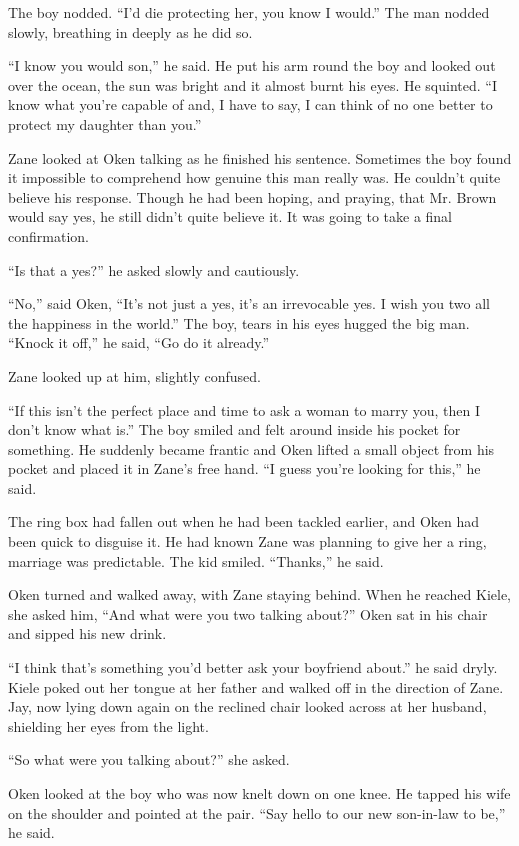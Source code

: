   The boy nodded.  ``I'd die protecting her, you know I would.''  The man nodded slowly, breathing in deeply as he did so.  

``I know you would son,'' he said.  He put his arm round the boy and looked out over the ocean, the sun was bright and it almost burnt his eyes.  He squinted.  ``I know what you're capable of and, I have to say, I can think of no one better to protect my daughter than you.''

Zane looked at Oken talking as he finished his sentence.  Sometimes the boy found it impossible to comprehend how genuine this man really was.  He couldn't quite believe his response.  Though he had been hoping, and praying, that Mr. Brown would say yes, he still didn't quite believe it.  It was going to take a final confirmation.

``Is that a yes?'' he asked slowly and cautiously.

``No,'' said Oken, ``It's not just a yes, it's an irrevocable yes.  I wish you two all the happiness in the world.''  The boy, tears in his eyes hugged the big man.  ``Knock it off,'' he said, ``Go do it already.''

Zane looked up at him, slightly confused.

``If this isn't the perfect place and time to ask a woman to marry you, then I don't know what is.''  The boy smiled and felt around inside his pocket for something.  He suddenly became frantic and Oken lifted a small object from his pocket and placed it in Zane's free hand.  ``I guess you're looking for this,'' he said.

The ring box had fallen out when he had been tackled earlier, and Oken had been quick to disguise it.  He had known Zane was planning to give her a ring, marriage was predictable.  The kid smiled.  ``Thanks,'' he said.

Oken turned and walked away, with Zane staying behind.  When he reached Kiele, she asked him, ``And what were you two talking about?''  Oken sat in his chair and sipped his new drink.

``I think that's something you'd better ask your boyfriend about.'' he said dryly.  Kiele poked out her tongue at her father and walked off in the direction of Zane.  Jay, now lying down again on the reclined chair looked across at her husband, shielding her eyes from the light.  

``So what were you talking about?'' she asked.

Oken looked at the boy who was now knelt down on one knee.  He tapped his wife on the shoulder and pointed at the pair.  ``Say hello to our new son-in-law to be,'' he said.

